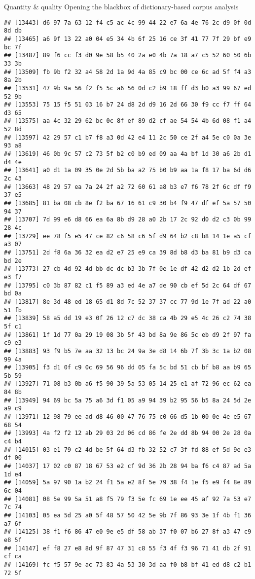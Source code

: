 \documentclass[
  ignorenonframetext,
]{beamer}
\begin{document}
\begin{frame}[fragile]{Quantity \& quality \textbar{} Opening the
blackbox of dictionary-based corpus analysis}
\begin{verbatim}
## [13443] d6 97 7a 63 12 f4 c5 ac 4c 99 44 22 e7 6a 4e 76 2c d9 0f 0d 8d db
## [13465] a6 9f 13 22 a0 04 e5 34 4b 6f 25 16 ce 3f 41 77 7f 29 bf e9 bc 7f
## [13487] 89 f6 cc f3 d0 9e 58 b5 40 2a e0 4b 7a 18 a7 c5 52 60 50 6b 33 3b
## [13509] fb 9b f2 32 a4 58 2d 1a 9d 4a 85 c9 bc 00 ce 6c ad 5f f4 a3 8a 2b
## [13531] 47 9b 9a 56 f2 f5 5c a6 56 0d c2 b9 18 ff d3 b0 a3 99 67 ed 52 9b
## [13553] 75 15 f5 51 03 16 b7 24 d8 2d d9 16 2d 66 30 f9 cc f7 ff 64 d3 65
## [13575] aa 4c 32 29 62 bc 0c 8f ef 89 d2 cf ae 54 54 4b 6d 08 f1 a4 52 8d
## [13597] 42 29 57 c1 b7 f8 a3 0d 42 e4 11 2c 50 ce 2f a4 5e c0 0a 3e 93 a8
## [13619] 46 0b 9c 57 c2 73 5f b2 c0 b9 ed 09 aa 4a bf 1d 30 a6 2b d1 d4 4e
## [13641] a0 d1 1a 09 35 0e 2d 5b ba a2 75 b0 b9 aa 1a f8 17 ba 6d d6 2c 43
## [13663] 48 29 57 ea 7a 24 2f a2 72 60 61 a8 b3 e7 f6 78 2f 6c df f9 37 e5
## [13685] 81 ba 08 cb 8e f2 ba 67 16 61 c9 30 b4 f9 47 df ef 5a 57 50 94 37
## [13707] 7d 99 e6 d8 66 ea 6a 8b d9 28 a0 2b 17 2c 92 d0 d2 c3 0b 99 28 4c
## [13729] ee 78 f5 e5 47 ce 82 c6 58 c6 5f d9 64 b2 c8 b8 14 1e a5 cf a3 07
## [13751] 2d f8 6a 36 32 ea d2 e7 25 e9 ca 39 8d b8 d3 ba 81 b9 d3 ca bd 2e
## [13773] 27 cb 4d 92 4d bb dc dc b3 3b 7f 0e 1e df 42 d2 d2 1b 2d ef e3 f7
## [13795] c0 3b 87 82 c1 f5 89 a3 ed 4e a7 de 90 cb ef 5d 2c 64 df 67 bd 0a
## [13817] 8e 3d 48 ed 18 65 d1 8d 7c 52 37 37 cc 77 9d 1e 7f ad 22 a0 51 fb
## [13839] 58 a5 dd 19 e3 0f 26 12 c7 dc 38 ca 4b 29 e5 4c 26 c2 74 38 5f c1
## [13861] 1f 1d 77 0a 29 19 08 3b 5f 43 bd 8a 9e 86 5c eb d9 2f 97 fa c9 e3
## [13883] 93 f9 b5 7e aa 32 13 bc 24 9a 3e d8 14 6b 7f 3b 3c 1a b2 08 99 4a
## [13905] f3 d1 0f c9 0c 69 56 96 dd 05 fa 5c bd 51 cb bf b8 aa b9 65 5b 59
## [13927] 71 08 b3 0b a6 f5 90 39 5a 53 05 14 25 e1 af 72 96 ec 62 ea 84 8b
## [13949] 94 69 bc 5a 75 a6 3d f1 05 a9 94 39 b2 95 56 b5 8a 24 5d 2e a9 c9
## [13971] 12 98 79 ee ad d8 46 00 47 76 75 c0 66 d5 1b 00 0e 4e e5 67 68 54
## [13993] 4a f2 f2 12 ab 29 03 2d 06 cd 86 fe 2e dd 8b 94 00 2e 28 0a c4 b4
## [14015] 03 e1 79 c2 4d be 5f 64 d3 fb 32 52 c7 3f fd 88 ef 5d 9e e3 df 00
## [14037] 17 02 c0 87 18 67 53 e2 cf 9d 36 2b 28 94 ba f6 c4 87 ad 5a 1d e4
## [14059] 5a 97 90 1a b2 24 f1 5a e2 8f 5e 79 38 f4 1e f5 e9 f4 8e 89 6c 04
## [14081] 08 5e 99 5a 51 a8 f5 79 f3 5e fc 69 1e ee 45 af 92 7a 53 e7 7c 74
## [14103] 05 ea 5d 25 a0 5f 48 57 50 42 5e 9b 7f 86 93 3e 1f 4b f1 36 a7 6f
## [14125] 38 f1 f6 86 47 e0 9e e5 df 58 ab 37 f0 07 b6 27 8f a3 47 c9 e8 5f
## [14147] ef f8 27 e8 8d 9f 87 47 31 c8 55 f3 4f f3 96 71 41 db 2f 91 cf ca
## [14169] fc f5 57 9e ac 73 83 4a 53 30 3d aa f0 b8 bf 41 ed d8 c2 b1 72 5f

\end{verbatim}
\end{frame}
\end{document}
